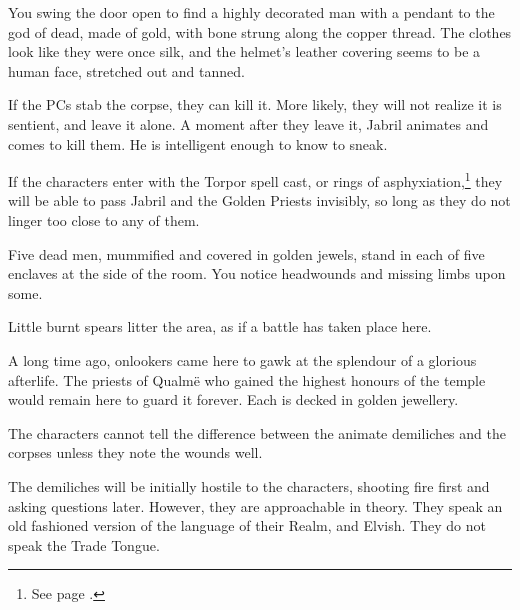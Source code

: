\begin{multicols}{2}
\begin{boxtext}

	You swing the door open to find a highly decorated man with a pendant to the god of dead, made of gold, with bone strung along the copper thread.  The clothes look like they were once silk, and the helmet's leather covering seems to be a human face, stretched out and tanned.

\end{boxtext}

If the PCs stab the corpse, they can kill it.
More likely, they will not realize it is sentient, and leave it alone.
A moment after they leave it, Jabril animates and comes to kill them.
He is intelligent enough to know to sneak.



If the characters enter with the Torpor spell cast, or rings of asphyxiation,\footnote{See page \pageref{ring_asphyxiation}.} they will be able to pass Jabril and the Golden Priests invisibly, so long as they do not linger too close to any of them.


\begin{boxtext}

	Five dead men, mummified and covered in golden jewels, stand in each of five enclaves at the side of the room.
	You notice headwounds and missing limbs upon some.

	Little burnt spears litter the area, as if a battle has taken place here.

\end{boxtext}

A long time ago, onlookers came here to gawk at the splendour of a glorious afterlife.  The priests of Qualm\"{e} who gained the highest honours of the temple would remain here to guard it forever.  Each is decked in golden jewellery.


\demilich

The characters cannot tell the difference between the animate demiliches and the corpses unless they note the wounds well.

The demiliches will be initially hostile to the characters, shooting fire first and asking questions later.  However, they are approachable in theory.  They speak an old fashioned version of the language of their Realm, and Elvish.  They do not speak the Trade Tongue.


\end{multicols}

